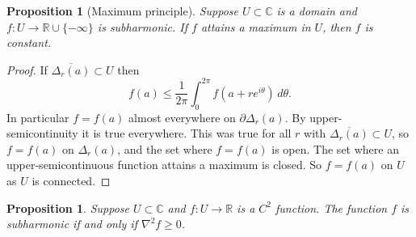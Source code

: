 \documentclass[12pt,openany]{book}
\newcommand{\C}{{\mathbb{C}}}
\newcommand{\R}{{\mathbb{R}}}
\theoremstyle{plain}
\newtheorem{prop}[thm]{Proposition}
\theoremstyle{remark}
\theoremstyle{definition}
\theoremstyle{exercise}
\theoremstyle{example}
\begin{document}
\begin{prop}[Maximum principle]
Suppose $U \subset \C$ is a domain and $f \colon U \to \R \cup \{ -\infty \}$
is subharmonic.  If $f$ attains a maximum in $U$, then $f$ is constant.
\end{prop}

\begin{proof}
If
$\overline{\Delta_r(a)} \subset U$ then
\begin{equation*}
f(a) \leq \frac{1}{2\pi} \int_0^{2\pi} f(a+re^{i\theta})\, d\theta .
\end{equation*}
In particular $f = f(a)$ almost everywhere on $\partial \Delta_r(a)$.
By upper-semicontinuity it is true everywhere.  This was true for all $r$
with $\overline{\Delta_r(a)} \subset U$, so $f=f(a)$ on $\Delta_r(a)$,
and the set where $f=f(a)$ is open.  The set where an upper-semicontinuous
function attains a maximum is closed.  So $f=f(a)$ on $U$ as $U$ is
connected.
\end{proof}



\begin{prop}
Suppose $U \subset \C$ and $f \colon U \to \R$ is a $C^2$ function.
The function $f$ is subharmonic if and only if
$\nabla^2 f \geq 0$.
\end{prop}
\end{document}
